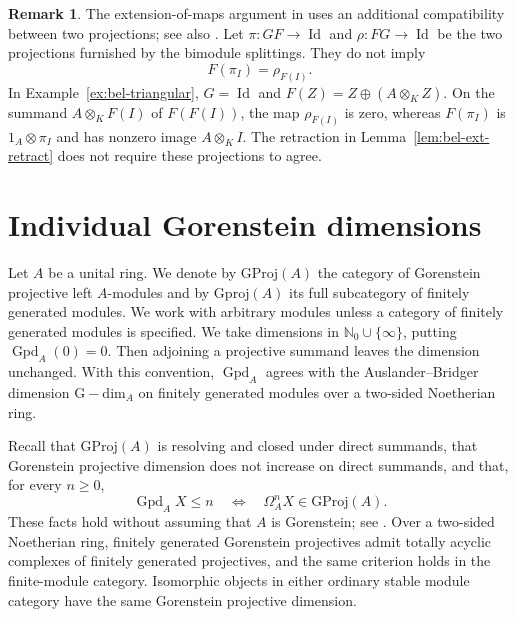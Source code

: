 \documentclass[12pt,a4paper,english,reqno]{amsart}
\numberwithin{equation}{section}
\theoremstyle{plain}
\theoremstyle{definition}
\newtheorem{remark}[theorem]{Remark}
\begin{document}
\begin{remark}
\label{rem:bel-projections}
The extension-of-maps argument in
\cite[Lemma~3.1(1), p.~2593]{bel-SunZhao2025} uses an additional
compatibility between two projections; see also
\cite[Section~3]{bel-Tang2026}.
Let $\pi\colon GF\to\operatorname{Id}$ and
$\rho\colon FG\to\operatorname{Id}$ be the two projections furnished
by the bimodule splittings.  They do not imply
\[
 F(\pi_I)=\rho_{F(I)}.
\]
In Example~\ref{ex:bel-triangular}, $G=\operatorname{Id}$ and
$F(Z)=Z\oplus(A\otimes_KZ)$.  On the summand $A\otimes_KF(I)$ of
$F(F(I))$, the map $\rho_{F(I)}$ is zero, whereas $F(\pi_I)$ is
$1_A\otimes\pi_I$ and has nonzero image $A\otimes_KI$.
The retraction in Lemma~\ref{lem:bel-ext-retract} does not require
these projections to agree.
\end{remark}

\section{Individual Gorenstein dimensions}
\label{sec:individual-gorenstein-dimensions}

Let $A$ be a unital ring. We denote by $\mathrm{GProj}(A)$
the category of Gorenstein projective left $A$-modules and by
$\mathrm{Gproj}(A)$ its full subcategory of finitely generated
modules. We work with arbitrary modules unless a category of
finitely generated modules is specified. We take dimensions in
$\mathbb N_0\cup\{\infty\}$, putting $\operatorname{Gpd}_A(0)=0$.
Then adjoining a projective summand leaves the dimension unchanged.
With this convention, $\operatorname{Gpd}_A$ agrees with the
Auslander--Bridger dimension $\mathrm{G\!\! -\! dim}_A$ on finitely
generated modules over a two-sided Noetherian ring.

Recall that $\mathrm{GProj}(A)$ is resolving and closed under direct
summands, that Gorenstein projective dimension does not increase on
direct summands, and that, for every $n\geq 0$,
\begin{equation}
  \operatorname{Gpd}_A X\leq n
  \quad\Longleftrightarrow\quad
  \Omega_A^nX\in\mathrm{GProj}(A).
  \label{eq:gpd-syzygy-test}
\end{equation}
These facts hold without assuming that $A$ is Gorenstein; see
\cite[Theorem~2.5, Propositions~2.16, 2.18--2.19, and
Theorem~2.20]{Holm2004}.  Over a two-sided Noetherian ring, finitely
generated Gorenstein projectives admit totally acyclic complexes of
finitely generated projectives, and the same criterion holds in the
finite-module category.  Isomorphic objects in either ordinary stable
module category have the same Gorenstein projective dimension.
\end{document}
